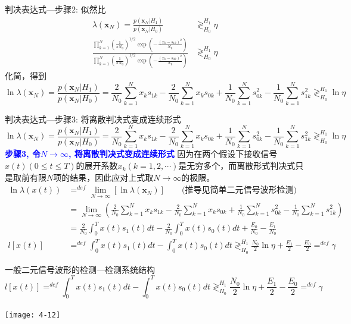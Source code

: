 \begin{frame}[shrink]{判决表达式---步骤2: 似然比}
\begin{align*}
\lambda(\bm{x}_N)=\frac{p(\bm{x}_N|H_1)}{p(\bm{x}_N|H_0)}&\mathop{\gtrless}_{H_0}^{H_1}\eta\\
\frac{\prod\limits_{k=1}^{N}\left(\frac{1}{\pi N_0}\right)^{1/2}\exp\left(-\frac{(x_k-s_{1k})^2}{N_0}\right)}
{\prod\limits_{k=1}^{N}\left(\frac{1}{\pi N_0}\right)^{1/2}\exp\left(-\frac{(x_k-s_{0k})^2}{N_0}\right)}&\mathop{\gtrless}_{H_0}^{H_1}\eta
\end{align*}
化简，得到
\[\ln\lambda(\bm{x}_N)=\frac{p(\bm{x}_N|H_1)}{p(\bm{x}_N|H_0)}=\frac{2}{N_0}\sum\limits_{k=1}^{N}x_ks_{1k}-\frac{2}{N_0}\sum\limits_{k=1}^{N}x_ks_{0k}+\frac{1}{N_0}\sum\limits_{k=1}^{N}s_{0k}^2-\frac{1}{N_0}\sum\limits_{k=1}^{N}s_{1k}^2\mathop{\gtrless}_{H_0}^{H_1}\ln\eta \]
\end{frame}

\begin{frame}[shrink]{判决表达式---步骤3: 将离散判决式变成连续形式}
\[\ln\lambda(\bm{x}_N)=\frac{p(\bm{x}_N|H_1)}{p(\bm{x}_N|H_0)}=\frac{2}{N_0}\sum\limits_{k=1}^{N}x_ks_{1k}-\frac{2}{N_0}\sum\limits_{k=1}^{N}x_ks_{0k}+\frac{1}{N_0}\sum\limits_{k=1}^{N}s_{0k}^2-\frac{1}{N_0}\sum\limits_{k=1}^{N}s_{1k}^2\mathop{\gtrless}_{H_0}^{H_1}\ln\eta \]
\textbf{\textcolor{blue}{步骤3, 令$N\to\infty$, 将离散判决式变成连续形式}}
因为在两个假设下接收信号$x(t)(0\le t\le T)$的展开系数$x_k(k=1,2,\cdots)$是无穷多个，而离散形式判决式只是取前有限$N$项的结果，因此应对上式取$N\to\infty$的极限。
\begin{align*}
\ln\lambda(x(t))&\mathop{=}^{def}\lim\limits_{N\to\infty}[\ln\lambda(\bm{x}_N)]\qquad\text{(推导见简单二元信号波形检测)}\\
&=\lim\limits_{N\to\infty}\left(\frac{2}{N_0}\sum\limits_{k=1}^{N}x_ks_{1k}-\frac{2}{N_0}\sum\limits_{k=1}^{N}x_ks_{0k}+\frac{1}{N_0}\sum\limits_{k=1}^{N}s_{0k}^2-\frac{1}{N_0}\sum\limits_{k=1}^{N}s_{1k}^2\right)\\
&=\frac{2}{N_0}\int_{0}^{T}x(t)s_1(t)dt-\frac{2}{N_0}\int_{0}^{T}x(t)s_0(t)dt+\frac{E_0}{N_0}-\frac{E_1}{N_0}\\
l[x(t)]&\mathop{=}^{def}\int_{0}^{T}x(t)s_1(t)dt-\int_{0}^{T}x(t)s_0(t)dt\mathop{\gtrless}_{H_0}^{H_1}\frac{N_0}{2}\ln\eta+\frac{E_1}{2}-\frac{E_0}{2}\mathop{=}^{def}\gamma
\end{align*}
\end{frame}

\begin{frame}{一般二元信号波形的检测---检测系统结构}
\[l[x(t)]\mathop{=}^{def}\int_{0}^{T}x(t)s_1(t)dt-\int_{0}^{T}x(t)s_0(t)dt\mathop{\gtrless}_{H_0}^{H_1}\frac{N_0}{2}\ln\eta+\frac{E_1}{2}-\frac{E_0}{2}\mathop{=}^{def}\gamma \]
~\\
\centering
\texttt{[image: 4-12]}\\
\end{frame}

